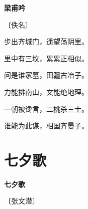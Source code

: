 \documentclass[12pt,UTF-8,openany,fontset=none]{ctexbook}
\begin{document}
\begin{center}
    {\bfseries 梁甫吟}

    \vspace{18pt}

    \begin{large}\xuwen
        〔佚名〕
    \end{large}

\end{center}

    \vspace{18pt}  %

\begin{center}
    \begin{Large}

        步出齐城门，遥望荡阴里。

        里中有三坟，累累正相似。

        问是谁家墓，田疆古冶子。

        力能排南山，文能绝地理。

        一朝被谗言，二桃杀三士。

        谁能为此谋，相国齐晏子。

    \end{Large}

\end{center}

\vspace{8pt}
\clearpage

\section{七夕歌}


\begin{center}
    {\bfseries 七夕歌}

    \vspace{18pt}

    \begin{large}\xuwen
        〔张文潜〕
    \end{large}

\end{center}

    \vspace{18pt}  %
\end{document}
